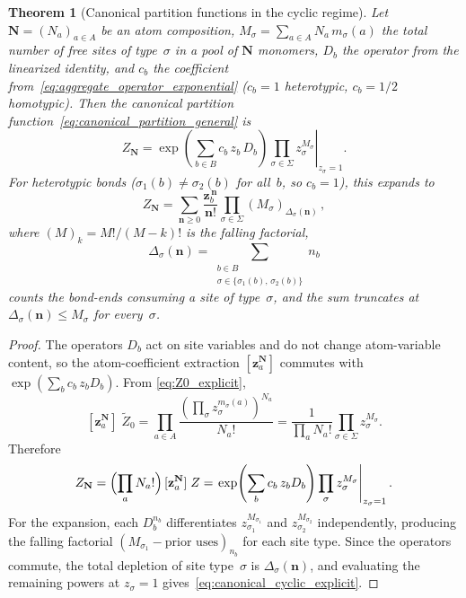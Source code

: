 \documentclass[11pt]{amsart}
\newcommand{\GFensemble}{Z}
\theoremstyle{definition}
\theoremstyle{plain}
\newtheorem{theorem}{Theorem}
\theoremstyle{remark}
\begin{document}
\begin{theorem}[Canonical partition functions in the cyclic regime]
\label{thm:canonical_cyclic}
Let $\mathbf{N}=(N_a)_{a\in A}$ be an atom composition,
$M_\sigma = \sum_{a\in A} N_a\,m_\sigma(a)$ the total number of free sites of type~$\sigma$ in a pool of $\mathbf{N}$ monomers,
$D_b$ the operator from the linearized identity, and $c_b$ the coefficient from~\eqref{eq:aggregate_operator_exponential} ($c_b=1$ heterotypic, $c_b=1/2$ homotypic).
Then the canonical partition function~\eqref{eq:canonical_partition_general} is
\begin{equation}\label{eq:canonical_cyclic_operator}
\GFensemble_{\mathbf{N}}
= \left.\exp\!\left(\sum_{b\in B} c_b\,z_b\,D_b\right)
\prod_{\sigma\in\Sigma} z_\sigma^{M_\sigma}\right|_{z_\sigma=1}.
\end{equation}
For heterotypic bonds ($\sigma_1(b)\neq\sigma_2(b)$ for all~$b$, so $c_b=1$), this expands to
\begin{equation}\label{eq:canonical_cyclic_explicit}
\GFensemble_{\mathbf{N}}
= \sum_{\mathbf{n}\ge 0}
\frac{\mathbf{z}_b^{\,\mathbf{n}}}{\mathbf{n}!}
\prod_{\sigma\in\Sigma}(M_\sigma)_{\Delta_\sigma(\mathbf{n})}\,,
\end{equation}
where $(M)_k = M!/(M-k)!$ is the falling factorial,
\[
\Delta_\sigma(\mathbf{n}) = \sum_{\substack{b\in B\\ \sigma\in\{\sigma_1(b),\,\sigma_2(b)\}}} n_b
\]
counts the bond-ends consuming a site of type~$\sigma$,
and the sum truncates at $\Delta_\sigma(\mathbf{n})\le M_\sigma$ for every~$\sigma$.
\end{theorem}

\begin{proof}
The operators $D_b$ act on site variables and do not change atom-variable content,
so the atom-coefficient extraction $[\mathbf{z}_a^{\mathbf{N}}]$ commutes with $\exp(\sum_b c_b\,z_b D_b)$.
From \eqref{eq:Z0_explicit},
\[
[\mathbf{z}_a^{\mathbf{N}}]\;\widetilde{\GFensemble}_0
= \prod_{a\in A}\frac{(\prod_\sigma z_\sigma^{m_\sigma(a)})^{N_a}}{N_a!}
= \frac{1}{\prod_a N_a!}\prod_{\sigma\in\Sigma} z_\sigma^{M_\sigma}.
\]
Therefore
\[
\GFensemble_{\mathbf{N}}
= \Bigl(\prod_a N_a!\Bigr)\,[\mathbf{z}_a^{\mathbf{N}}]\;\GFensemble
= \left.\exp\!\left(\sum_b c_b\,z_b D_b\right)\prod_\sigma z_\sigma^{M_\sigma}\right|_{z_\sigma=1}.
\]
For the expansion, each $D_b^{n_b}$ differentiates $z_{\sigma_1}^{M_{\sigma_1}}$ and $z_{\sigma_2}^{M_{\sigma_2}}$ independently,
producing the falling factorial $(M_{\sigma_1} - \text{prior uses})_{n_b}$ for each site type.
Since the operators commute, the total depletion of site type~$\sigma$ is $\Delta_\sigma(\mathbf{n})$,
and evaluating the remaining powers at $z_\sigma=1$ gives~\eqref{eq:canonical_cyclic_explicit}.
\end{proof}
\end{document}
